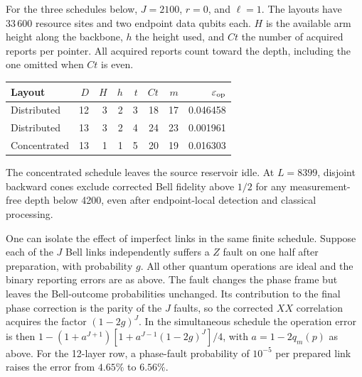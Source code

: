 \documentclass[aps,prl,twocolumn,superscriptaddress,longbibliography,reprint,floatfix]{revtex4-2}
\newcommand{\eps}{\varepsilon}
\begin{document}
For the three schedules below, $J=2100$, $r=0$, and $\ell=1$. The
layouts have $33\,600$ resource sites and two endpoint data qubits each.
$H$ is the available arm height along the backbone, $h$ the height
used, and $Ct$ the number of acquired reports per pointer. All acquired
reports count toward the depth, including the one omitted when $Ct$ is even.
\begin{center}
\begin{tabular}{@{}lrrrrrrr@{}}
\toprule
Layout & $D$ & $H$ & $h$ & $t$ & $Ct$ & $m$ & $\eps_{\rm op}$\\
\midrule
Distributed & 12 & 3 & 2 & 3 & 18 & 17 & 0.046458\\
Distributed & 13 & 3 & 2 & 4 & 24 & 23 & 0.001961\\
Concentrated & 13 & 1 & 1 & 5 & 20 & 19 & 0.016303\\
\bottomrule
\end{tabular}
\end{center}
The concentrated schedule leaves the source reservoir idle. At $L=8399$,
disjoint backward cones exclude corrected Bell fidelity above $1/2$
for any measurement-free depth below 4200, even after endpoint-local
detection and classical processing.

One can isolate the effect of imperfect links in the same finite schedule.
Suppose each of the $J$ Bell links independently suffers a $Z$ fault on
one half after preparation, with probability $g$. All other quantum
operations are ideal and the binary reporting errors are as above. The fault changes the phase frame but leaves the Bell-outcome
probabilities unchanged. Its contribution to the final phase correction is
the parity of the $J$ faults, so the corrected $XX$ correlation acquires
the factor $(1-2g)^J$. In the simultaneous schedule the operation error is
then $1-(1+a^{J+1})[1+a^{J-1}(1-2g)^J]/4$, with $a=1-2q_m(p)$ as above.
For the 12-layer row, a phase-fault probability of $10^{-5}$ per prepared
link raises the error from $4.65\%$ to $6.56\%$.
\end{document}
